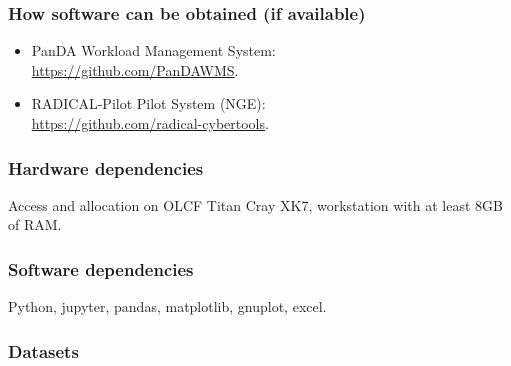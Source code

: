 \subsubsection{How software can be obtained (if available)}

\begin{itemize}
    \item PanDA Workload Management System: \\ \url{https://github.com/PanDAWMS}.
    \item RADICAL-Pilot Pilot System (NGE): \\ \url{https://github.com/radical-cybertools}.
\end{itemize}


\subsubsection{Hardware dependencies}

Access and allocation on OLCF Titan Cray XK7, workstation with at least 8GB of RAM.


\subsubsection{Software dependencies}

Python, jupyter, pandas, matplotlib, gnuplot, excel.


\subsubsection{Datasets}

